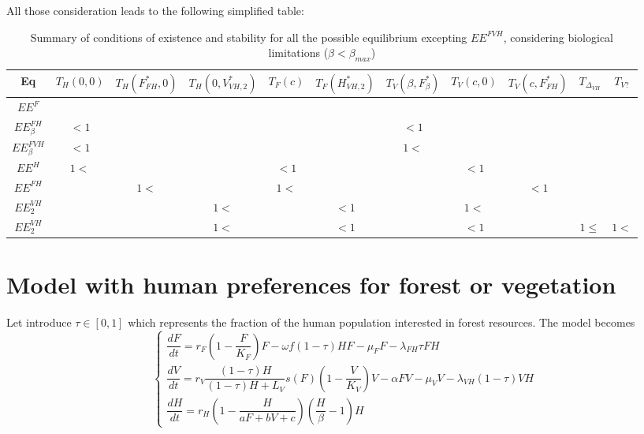 \documentclass{article}
\begin{document}
All those consideration leads to the following simplified table:
\begin{table}[ht]
\centering
\caption{\centering Summary of conditions of existence and stability for all the possible equilibrium excepting $EE^{FVH}$, considering biological limitations ($\beta < \beta_{max}$)}
{\small
\begin{tabular}{c|c|c|c|c|c|c|c|c|c|c}
Eq & $T_H(0, 0)$ & $T_H(F^*_{FH}, 0)$ & $T_H(0, V^*_{VH,2})$ & $T_F(c)$& $T_F(H^*_{VH, 2})$ & $T_V(\beta, F^*_\beta)$ & $T_V(c, 0)$ & $T_V(c, F^*_{FH})$ & $T_{\Delta_{VH}}$ & $T_{V?}$  \\ \hline
$EE^F$ & & & & & & & & & & \\ \hline
$EE^{FH}_\beta$ & $<1$ & & & & & $<1$ & & & & \\ \hline
$EE^{FVH}_\beta$ & $<1$ & & & & & $1<$ & & & & \\ \hline
$EE^H $ & $1<$  & & & $<1$& & & $<1$ & & & \\ \hline
$EE^{FH} $ & & $1<$  & & $1<$ & & & & $<1$ & & \\ \hline
$EE^{VH}_2 $ & & & $1<$ & & $<1$ & & $1<$ & & & \\ \hline
$EE^{VH}_2 $ & & & $1<$ & & $<1$ & & $<1$ & &$1\leq$& $1<$ \\ \hline
\end{tabular}
}
\end{table}



\section{Model with human preferences for forest or vegetation}
Let introduce $\tau \in [0,1]$ which represents the fraction of the human population interested in forest resources. The model becomes
\begin{equation}    
\left\{ \begin{array}{l}
\dfrac{dF}{dt}=r_{F}\left(1-\dfrac{F}{K_{F}}\right)F-\omega f (1-\tau) H F - \mu_F F -\lambda_{FH} \tau F H \\
\dfrac{dV}{dt}=r_V \dfrac{(1-\tau)H}{(1-\tau)H + L_V} s(F) \left(1-\dfrac{V}{K_{V}}\right)V -\alpha FV-\mu_V V -\lambda_{VH} (1-\tau) V H\\
\dfrac{dH}{dt}=r_H \left(1-\dfrac{H}{aF + bV + c} \right) (\dfrac{H}{\beta} - 1) H
\end{array}\right.
\label{modelPreferences}
\end{equation}
\end{document}
